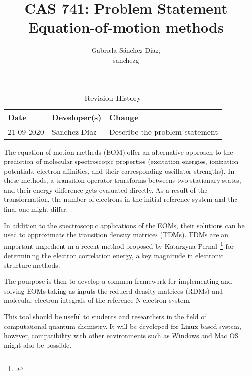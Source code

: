 \documentclass{article}
\title{CAS 741: Problem Statement\\Equation-of-motion methods}
\author{Gabriela S\'anchez D\'iaz,\\ sanchezg}
\date{}
\begin{document}
\maketitle

\begin{table}[hp]
\caption{Revision History} \label{TblRevisionHistory}
\begin{tabularx}{\textwidth}{llX}
\toprule
\textbf{Date} & \textbf{Developer(s)} & \textbf{Change}\\
\midrule
21-09-2020 & Sanchez-Diaz & Describe the problem statement\\
\bottomrule
\end{tabularx}
\end{table}

The equation-of-motion methods (EOM) offer an alternative approach to the prediction of molecular spectroscopic properties (excitation energies, ionization potentials, electron affinities, and their corresponding oscillator strengths). In these methods, a transition operator transforms betweens two stationary states, and their energy difference gets evaluated directly. As a result of the transformation, the number of electrons in the initial reference system and the final one might differ.

In addition to the spectroscopic applications of the EOMs, their solutions can be used to approximate the transition density matrices (TDMs). TDMs are an important ingredient in a recent method proposed by Katarzyna Pernal~\footcite{Pernal2018} for determining the electron correlation energy, a key magnitude in electronic structure methods.  

The pourpose is then to develop a common framework for implementing and solving EOMs taking as inputs the reduced density matrices (RDMs) and molecular electron integrals of the reference N-electron system. 

This tool should be useful to students and researchers in the field of computational quantum chemistry. It will be developed for Linux based system, however, compatibility with other environments such as Windows and Mac OS might also be possible.

\printbibliography

\end{document}
